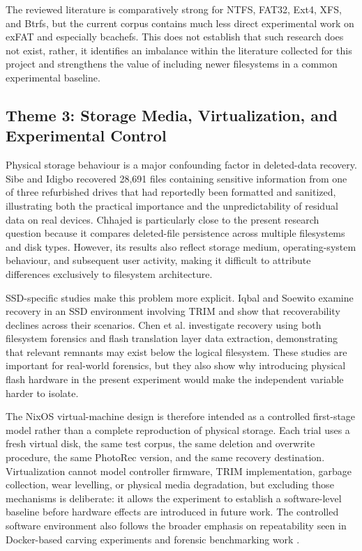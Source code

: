 \documentclass[conference]{IEEEtran}
\begin{document}
The reviewed literature is comparatively strong for NTFS, FAT32, Ext4, XFS, and Btrfs, but the current corpus contains much less direct experimental work on exFAT and especially bcachefs. This does not establish that such research does not exist, rather, it identifies an imbalance within the literature collected for this project and strengthens the value of including newer filesystems in a common experimental baseline.

\subsection{Theme 3: Storage Media, Virtualization, and Experimental Control}

Physical storage behaviour is a major confounding factor in deleted-data recovery. Sibe and Idigbo \cite{sibe2025pii} recovered 28,691 files containing sensitive information from one of three refurbished drives that had reportedly been formatted and sanitized, illustrating both the practical importance and the unpredictability of residual data on real devices. Chhajed \cite{chhajed2024persistence} is particularly close to the present research question because it compares deleted-file persistence across multiple filesystems and disk types. However, its results also reflect storage medium, operating-system behaviour, and subsequent user activity, making it difficult to attribute differences exclusively to filesystem architecture.

SSD-specific studies make this problem more explicit. Iqbal and Soewito \cite{iqbal2020ssdtrim} examine recovery in an SSD environment involving TRIM and show that recoverability declines across their scenarios. Chen et al. \cite{chen2022ransomware} investigate recovery using both filesystem forensics and flash translation layer data extraction, demonstrating that relevant remnants may exist below the logical filesystem. These studies are important for real-world forensics, but they also show why introducing physical flash hardware in the present experiment would make the independent variable harder to isolate.

The NixOS virtual-machine design is therefore intended as a controlled first-stage model rather than a complete reproduction of physical storage. Each trial uses a fresh virtual disk, the same test corpus, the same deletion and overwrite procedure, the same PhotoRec version, and the same recovery destination. Virtualization cannot model controller firmware, TRIM implementation, garbage collection, wear levelling, or physical media degradation, but excluding those mechanisms is deliberate: it allows the experiment to establish a software-level baseline before hardware effects are introduced in future work. The controlled software environment also follows the broader emphasis on repeatability seen in Docker-based carving experiments \cite{kumar2022docker} and forensic benchmarking work \cite{wickramasekara2026autodfbench}.
\end{document}
